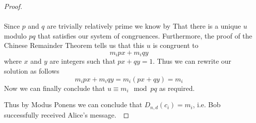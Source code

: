 \begin{definition}
\begin{proof}
\begin{itemize}
\begin{align*}
                        \end{align*}
                        Since $p$ and $q$ are trivially relatively prime we know by
                         That there is a unique $u$ modulo
                        $pq$ that satisfies our system of congruences. Furthermore, the proof
                        of the Chinese Remainder Theorem tells us that this $u$ is congruent to
                        \[
                            m_ipx + m_iqy
                        \]
                        where $x$ and $y$ are integers such that $px + qy = 1$. Thus we can
                        rewrite our solution as follows
                        \[
                            m_ipx + m_iqy = m_i(px + qy) = m_i
                        \]
                        Now we can finally conclude that $u \equiv m_i \mod pq$ as required.~\QED
                \end{itemize}
                Thus by Modus Ponens we can conclude that $D_{n, d}(c_i) = m_i$, i.e. Bob successfully
                received Alice's message.~\QED
            \end{proof}
        \end{definition}
